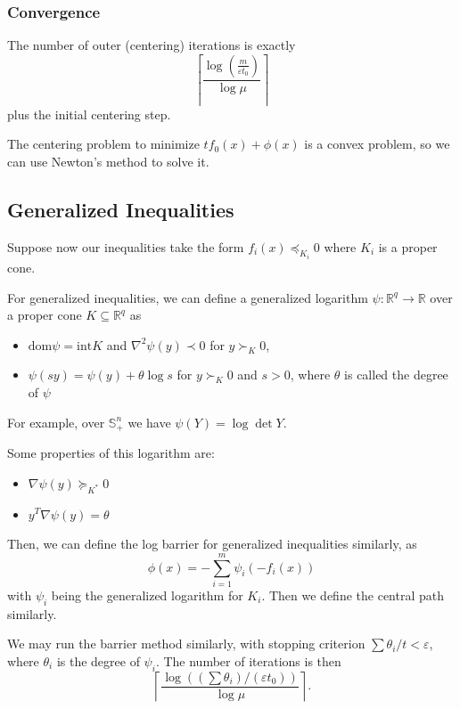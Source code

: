 \documentclass[11pt]{article}
\begin{document}
\subsubsection*{Convergence} 
The number of outer (centering) iterations is exactly 
\[ \left\lceil\frac{\log\left(\frac{m}{\varepsilon t_0}\right)}{\log\mu}\right\rceil \] 
plus the initial centering step. \par 
The centering problem to minimize $tf_0(x) + \phi(x)$ is a convex problem, so we can use Newton's method to solve it. \par

\subsection{Generalized Inequalities} 
Suppose now our inequalities take the form $f_i(x) \preceq_{K_i} 0$ where $K_i$ is a proper cone. \par

For generalized inequalities, we can define a generalized logarithm $\psi: \mathbb{R}^q \rightarrow \mathbb{R}$ over a proper cone $K \subseteq \mathbb{R}^q$ as 
\begin{itemize}
    \item $\mathrm{dom} \psi = \mathrm{int} K$ and $\nabla^2 \psi(y) \prec 0$ for $y \succ_K 0$, 
    \item $\psi(sy) = \psi(y) + \theta \log s$ for $y \succ_K 0$ and $s > 0$, where $\theta$ is called the degree of $\psi$
\end{itemize}

For example, over $\mathbb{S}_+^n$ we have $\psi(Y) = \log \det Y$. \par 

Some properties of this logarithm are: 
\begin{itemize}
    \item $\nabla \psi(y) \succeq_{K^*} 0$
    \item $y^T\nabla\psi(y) = \theta$ 
\end{itemize}

Then, we can define the log barrier for generalized inequalities similarly, as 
\[ \phi(x) = - \sum_{i=1}^m \psi_i(-f_i(x)) \] 
with $\psi_i$ being the generalized logarithm for $K_i$. Then we define the central path similarly. \par 

We may run the barrier method similarly, with stopping criterion $\sum \theta_i / t < \varepsilon$, where $\theta_i$ is the degree of $\psi_i$. The number of iterations is then 
\[ \left\lceil \frac{\log\left( (\sum \theta_i) / (\varepsilon t_0) \right)}{\log \mu} \right\rceil. \] 
\end{document}
